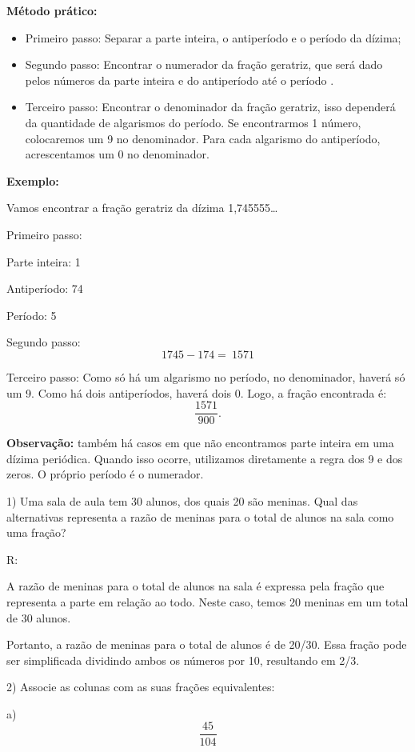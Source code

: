 \textbf{Método prático:}

\begin{itemize}
\item
  Primeiro passo: Separar a parte inteira, o antiperíodo e o período da
  dízima;
\item
  Segundo passo: Encontrar o numerador da fração geratriz, que será dado
  pelos números da parte inteira e do antiperíodo até o período .
\item
  Terceiro passo: Encontrar o denominador da fração geratriz, isso
  dependerá da quantidade de algarismos do período. Se encontrarmos 1
  número, colocaremos um 9 no denominador. Para cada algarismo do
  antiperíodo, acrescentamos um 0 no denominador.
\end{itemize}

\textbf{Exemplo:}

Vamos encontrar a fração geratriz da dízima 1,745555\ldots{}

Primeiro passo:

Parte inteira: 1

Antiperíodo: 74

Período: 5

Segundo passo: \[1745 - 174 = \ 1571\]

Terceiro passo: Como só há um algarismo no período, no denominador,
haverá só um 9. Como há dois antiperíodos, haverá dois 0. Logo, a fração
encontrada é: \[\frac{1571}{900}.\]

\textbf{Observação:} também há casos em que não encontramos parte
inteira em uma dízima periódica. Quando isso ocorre, utilizamos
diretamente a regra dos 9 e dos zeros. O próprio período é o numerador.


1) Uma sala de aula tem 30 alunos, dos quais 20 são meninas. Qual das
alternativas representa a razão de meninas para o total de alunos na
sala como uma fração?

R:

A razão de meninas para o total de alunos na sala é expressa pela fração
que representa a parte em relação ao todo. Neste caso, temos 20 meninas
em um total de 30 alunos.

Portanto, a razão de meninas para o total de alunos é de 20/30. Essa
fração pode ser simplificada dividindo ambos os números por 10,
resultando em 2/3.

2) Associe as colunas com as suas frações equivalentes:

a) \[\frac{45}{104}\]

